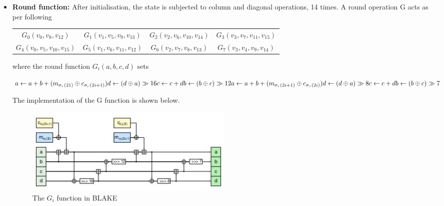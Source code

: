 \begin{itemize}
    \item {\bf Round function:} After initialisation, the state is subjected to column and diagonal operations, 14
    times. A round operation G acts as per following

    \begin{table}
      \begin{center}
        \begin{tabular}{ *{4}{c}}
        $ G_{0}(v_{0}, v_{8}, v_{12})$ & $G_{1}(v_{1}, v_{5}, v_{9}, v_{13})$ & $G_{2}(v_{2}, v_{6}, v_{10}, v_{14})$ & $G_{3}(v_{3}, v_{7}, v_{11}, v_{15}) $\\
 $G_{4}(v_{0}, v_{5}, v_{10}, v_{15})$ & $G_{5}(v_{1}, v_{6}, v_{11}, v_{12})$ & $G_{6}(v_{2}, v_{7}, v_{8}, v_{13})$ & $G_{7}(v_{3}, v_{4}, v_{9}, v_{14})$
        \end{tabular}
      \end{center}
    \end{table}


    where the round function $G_{i}(a, b, c, d)$ sets
    
    $
    a \gets a + b + (m_{\sigma_{r}(21)} \oplus c_{\sigma_{r}(2i + 1)}) \\
    d \gets (d \oplus a) \gg 16 \\
    c \gets c + d \\
    b \gets (b \oplus c) \gg 12 \\
    a \gets a + b + (m_{\sigma_{r}(2i + 1)} \oplus c_{\sigma_{r}(2i)}) \\
    d \gets (d \oplus a) \gg 8 \\
    c \gets c + d \\
    b \gets (b \oplus c) \gg 7
    $

    The implementation of the G function is shown below.
    \begin{figure}[h]
      \begin{center}
        \includegraphics[width=4in]{blakeGfunction.jpg}
      \end{center}
      \caption{The $G_{i}$ function in BLAKE}
      \label{fig:lab}
    \end{figure}


\end{itemize}
